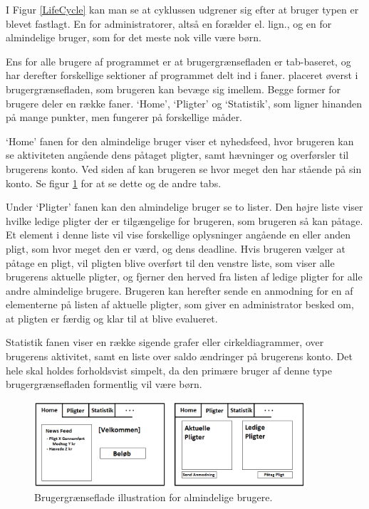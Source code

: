 I Figur \ref{LifeCycle} kan man se at cyklussen udgrener sig efter at bruger typen er blevet fastlagt. En for administratorer, altså en forælder el. lign., og en for almindelige bruger, som for det meste nok ville være børn.

Ens for alle brugere af programmet er at brugergrænsefladen er tab-baseret, og har derefter forskellige sektioner af programmet delt ind i faner. placeret øverst i brugergrænsefladen, som brugeren kan bevæge sig imellem. Begge former for brugere deler en række faner. ‘Home’, ‘Pligter’ og ‘Statistik’, som ligner hinanden på mange punkter, men fungerer på forskellige måder.

‘Home’ fanen for den almindelige bruger viser et nyhedsfeed, hvor brugeren kan se aktiviteten angående dens påtaget pligter, samt hævninger og overførsler til brugerens konto. Ved siden af kan brugeren se hvor meget den har stående på sin konto. Se figur \ref{BarnUI} for at se dette og de andre tabs.

Under ‘Pligter’ fanen kan den almindelige bruger se to lister. Den højre liste viser hvilke ledige pligter der er tilgængelige for brugeren, som brugeren så kan påtage. Et element i denne liste vil vise forskellige oplysninger angående en eller anden pligt, som hvor meget den er værd, og dens deadline. Hvis brugeren vælger at påtage en pligt, vil pligten blive overført til den venstre liste, som viser alle brugerens aktuelle pligter, og fjerner den herved fra listen af ledige pligter for alle andre almindelige brugere. Brugeren kan herefter sende en anmodning for en af elementerne på listen af aktuelle pligter, som giver en administrator besked om, at pligten er færdig og klar til at blive evalueret.

Statistik fanen viser en række sigende grafer eller cirkeldiagrammer, over brugerens aktivitet, samt en liste over saldo ændringer på brugerens konto. Det hele skal holdes forholdsvist simpelt, da den primære bruger af denne type brugergrænsefladen formentlig vil være børn.

\begin{figure}[H]
\centering
\includegraphics[width=0.9\textwidth]{Billeder/BarnUI.png}
\caption{Brugergrænseflade illustration for almindelige brugere.}
\label{BarnUI}
\end{figure}